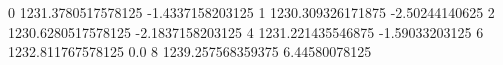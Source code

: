 0 1231.3780517578125 -1.4337158203125
1 1230.309326171875 -2.50244140625
2 1230.6280517578125 -2.1837158203125
4 1231.221435546875 -1.59033203125
6 1232.811767578125 0.0
8 1239.257568359375 6.44580078125
